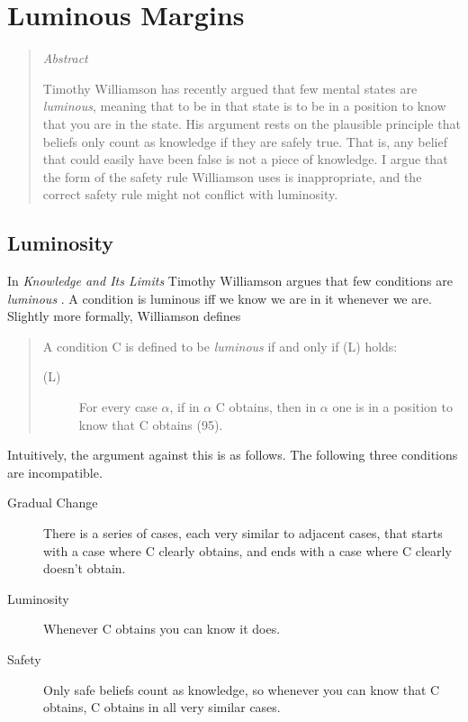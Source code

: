 


%
%
%
%
%
%
%
%
%
%
\chapter{Luminous Margins}

\begin{quote}
{\itshape
Abstract}

Timothy Williamson has recently argued that few mental states are \textit{luminous}, meaning that to be in that state is to be in a position to know that you are in the state. His argument rests on the plausible principle that beliefs only count as knowledge if they are safely true. That is, any belief that could easily have been false is not a piece of knowledge. I argue that the form of the safety rule Williamson uses is inappropriate, and the correct safety rule might not conflict with luminosity.
\end{quote}

\section{Luminosity}

In \textit{Knowledge and Its Limits} Timothy Williamson argues that few conditions are \textit{luminous} \cite[Ch. 4; all references to this book unless otherwise specified]{Williamson2000-WILKAI}. A condition is luminous iff we know we are in it whenever we are. Slightly more formally, Williamson defines

\begin{quote}
A condition C is defined to be \textit{luminous} if and only if (L) holds:
\begin{description}
\item[(L)] For every case ${\alpha}$, if in ${\alpha}$ C obtains, then in ${\alpha}$ one is in a position to know that C obtains (95).
\end{description}
\end{quote}

\noindent Intuitively, the argument against this is as follows. The following three conditions are incompatible.

\begin{description}
\item[Gradual Change] There is a series of cases, each very similar to adjacent cases, that starts with a case where C clearly obtains, and ends with a case where C clearly doesn't obtain.
\item[Luminosity] Whenever C obtains you can know it does.
\item[Safety] Only safe beliefs count as knowledge, so whenever you can know that C obtains, C obtains in all very similar cases.
\end{description}

